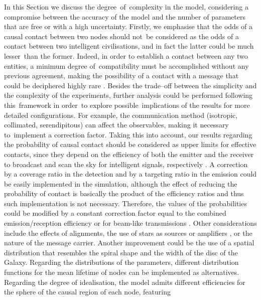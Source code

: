 \documentclass[crop]{CSLB}
\newcommand{\ceti}{node}
\newcommand{\cetis}{nodes}
\begin{document}
In this Section we discuss the degree of complexity in the model, considering a
compromise between the accuracy of the model and the number of parameters that
are free or with a high uncertainty.
%
Firstly, we emphasise that the odds of a causal contact between two nodes
should not be considered as the odds of a contact between two intelligent
civilisations, and in fact the latter could be much lesser than the former.
%
Indeed, in order to establish a contact between any two entities, a minimum
degree of compatibility must be accomplished without any previous agreement,
making the possibility of a contact with a message that could be deciphered
highly rare \citep[see e.g. ][]{forgan_collimated_2014}.
%
Besides the trade--off between the simplicity and the complexity of the
experiments, further analysis could be performed following this framework in
order to explore possible implications of the results for more detailed
configurations.
%
For example, the communication method (isotropic, collimated, serendipitous)
can affect the observables, making it necessary to implement a correction
factor.
%
Taking this into account, our results regarding the probability of causal
contact should be considered as upper limits for effective contacts, since they
depend on the efficiency of both the emitter and the receiver to broadcast and
scan the sky for intelligent signals, respectively
\citep{grimaldi_signal_2017}.
%
A correction by a coverage ratio in the detection and by a targeting ratio in the
emission could be easily implemented in the simulation, although the effect of
reducing the probability of contact is basically the product of the efficiency
ratios and thus such implementation is not necessary.
%
Therefore, the values of the probabilities could be modified by a constant
correction factor equal to the combined emission/reception efficiency
\citep{smith_broadcasting_2009, anchordoqui_upper_2019, forgan_collimated_2014}
or for beam-like transmissions \citep{grimaldi_signal_2017}. 
%
Other considerations include the effects of alignments, the use of stars as
sources or amplifiers \citep{Edmondson2003, borra_searching_2012}, or the
nature of the message carrier.
%
Another improvement could be the use of a spatial distribution that resembles
the spiral shape and the width of the disc of the Galaxy.
%
Regarding the distributions of the parameters, different distribution functions
for the mean lifetime of \cetis{} can be implemented as alternatives.
%
Regarding the degree of idealisation, the model admits different
efficiencies for the sphere of the causal region of each \ceti{}, featuring
\end{document}
